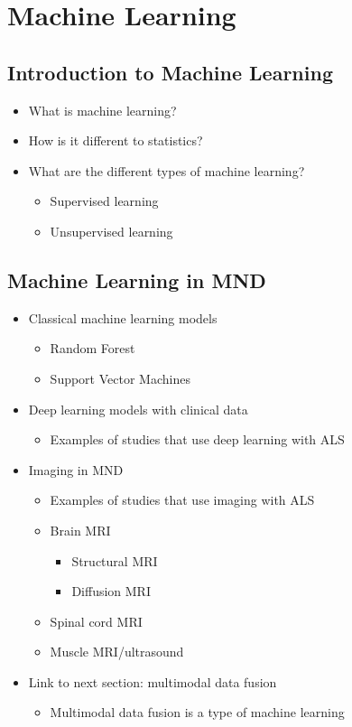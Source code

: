 \section{Machine Learning}

\subsection{Introduction to Machine Learning}

\begin{itemize}
    \item What is machine learning?
    \item How is it different to statistics?
    \item What are the different types of machine learning?
    \begin{itemize}
        \item Supervised learning
        \item Unsupervised learning
    \end{itemize}
\end{itemize}

\subsection{Machine Learning in MND}

\begin{itemize}
    \item Classical machine learning models
    \begin{itemize}
        \item Random Forest
        \item Support Vector Machines
    \end{itemize}
    \item Deep learning models with clinical data
    \begin{itemize}
        \item Examples of studies that use deep learning with ALS
    \end{itemize}
    \item Imaging in MND
    \begin{itemize}
        \item Examples of studies that use imaging with ALS
        \item Brain MRI
        \begin{itemize}
            \item Structural MRI
            \item Diffusion MRI
        \end{itemize}
        \item Spinal cord MRI
        \item Muscle MRI/ultrasound
    \end{itemize}
    \item Link to next section: multimodal data fusion
    \begin{itemize}
        \item Multimodal data fusion is a type of machine learning
    \end{itemize}
\end{itemize}

